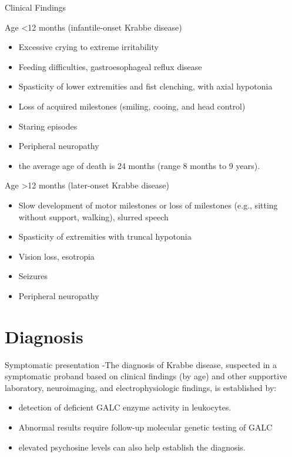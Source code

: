\documentclass[presentation, smaller]{beamer}
\begin{document}
\begin{frame}[label={sec:orgdf4b797}]{Clinical Findings}
\begin{block}{Age <12 months (infantile-onset Krabbe disease)}
\begin{itemize}
\item Excessive crying to extreme irritability
\item Feeding difficulties, gastroesophageal reflux disease
\item Spasticity of lower extremities and fist clenching, with axial hypotonia
\item Loss of acquired milestones (smiling, cooing, and head control)
\item Staring episodes
\item Peripheral neuropathy
\item the average age of death is 24 months (range 8 months to 9 years).
\end{itemize}
\end{block}

\begin{block}{Age >12 months (later-onset Krabbe disease)}
\begin{itemize}
\item Slow development of motor milestones or loss of milestones (e.g.,
sitting without support, walking), slurred speech
\item Spasticity of extremities with truncal hypotonia
\item Vision loss, esotropia
\item Seizures
\item Peripheral neuropathy
\end{itemize}
\end{block}
\end{frame}

\section{Diagnosis}
\label{sec:orgd48293c}
\begin{frame}[label={sec:org6f9ba05}]{Symptomatic presentation}
-The diagnosis of Krabbe disease, suspected in a
 symptomatic proband based on clinical findings (by age) and other
 supportive laboratory, neuroimaging, and electrophysiologic
 findings, is established by: 
\begin{itemize}
\item detection of deficient GALC enzyme activity in leukocytes.
\item Abnormal results require follow-up molecular genetic testing of GALC
\item elevated psychosine levels can also help establish the diagnosis.
\end{itemize}
\end{frame}
\end{document}
